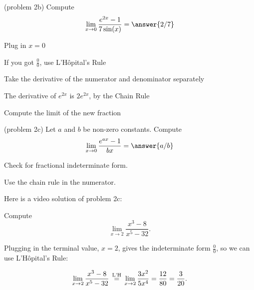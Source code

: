 \documentclass[handout]{ximera}
\begin{document}
\begin{problem}(problem 2b)
  Compute
  \[
  \lim_{x \to 0} \frac{e^{2x} -1}{7\sin(x)} = \answer{2/7}
  \]
  
    \begin{hint}
      Plug in $x=0$
    \end{hint}
    \begin{hint}
      If you got $\frac00$, use L'H\^{o}pital's Rule
    \end{hint}
    \begin{hint}
      Take the derivative of the numerator and denominator separately
    \end{hint}
		\begin{hint}
		 The derivative of $e^{2x}$ is $2e^{2x}$, by the Chain Rule
	  \end{hint}
		\begin{hint}
      Compute the limit of the new fraction
    \end{hint}
    
\end{problem}



\begin{problem}(problem 2c)
 Let $a$ and $b$ be non-zero constants. Compute
  \[
  \lim_{x \to 0} \frac{e^{ax} - 1}{bx} = \answer{a/b}
  \]
  
    \begin{hint}
      Check for fractional indeterminate form.
    \end{hint}
    
	  \begin{hint}
      Use the chain rule in the numerator.
    \end{hint}
	
\end{problem}

Here is a video solution of  problem 2c:
\begin{foldable}
\end{foldable}

\begin{example}[example 3]
Compute  
       \[
            \lim_{x \to 2} \frac{x^3 - 8}{x^5 - 32}.
        \]
            
Plugging in the terminal value, $x=2$, gives 
the indeterminate form $\frac00$, so we can use L'H\^{o}pital's Rule:
 
\[\lim_{x \to 2} \frac{x^3 - 8}{x^5 - 32} \,\overset{\scriptsize\text{L'H}}{=}\, \lim_{x \to 2} \frac{3x^2}{5x^4} = \frac{12}{80} = \frac{3}{20}.\]
\end{example}
\end{document}
